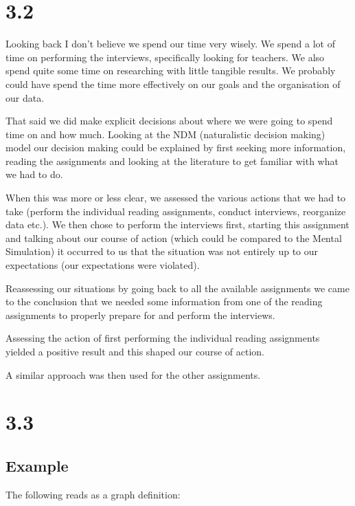 


\section*{3.2}
Looking back I don't believe we spend our time very wisely. We spend a lot of time on performing the interviews, specifically looking for teachers. We also spend quite some time on researching with little tangible results. We probably could have spend the time more effectively on our goals and the organisation of our data.

That said we did make explicit decisions about where we were going to spend time on and how much. Looking at the NDM (naturalistic decision making) model our decision making could be explained by first seeking more information, reading the assignments and looking at the literature to get familiar with what we had to do.

When this was more or less clear, we assessed the various actions that we had to take (perform the individual reading assignments, conduct interviews, reorganize data etc.). We then chose to perform the interviews first, starting this assignment and talking about our course of action (which could be compared to the Mental Simulation) it occurred to us that the situation was not entirely up to our expectations (our expectations were violated).

Reassessing our situations by going back to all the available assignments we came to the conclusion that we needed some information from one of the reading assignments to properly prepare for and perform the interviews.

Assessing the action of first performing the individual reading assignments yielded a positive result and this shaped our course of action.

A similar approach was then used for the other assignments.


\section*{3.3}
\subsection*{Example}
The following reads as a graph definition:

